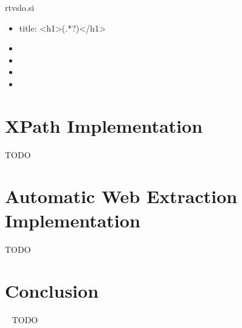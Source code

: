 \documentclass[9pt]{IEEEtran}
\begin{document}
rtvslo.si
\begin{itemize}
\item{title: <h1>(.*?)</h1>}
\item{}
\item{}
\item{}
\item{}
\end{itemize}

\section{XPath Implementation}

TODO

\section{Automatic Web Extraction Implementation}

TODO 

\section{Conclusion}

~\cite{jauntium, robots_txt, postgres}
TODO



\end{document}
